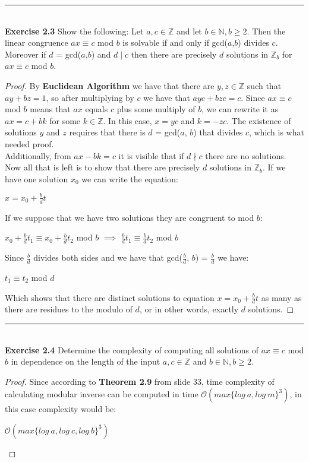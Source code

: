 \documentclass{article}
\begin{document}
\noindent\rule{12cm}{0.4pt}\\
\noindent \textbf{Exercise 2.3} Show the following:
Let $a, c \in \mathbb{Z}$ and let $b \in \mathbb{N}, b \geq 2$. Then the linear congruence $ax \equiv c$ mod $b$ is solvable if and only if gcd($a$,$b$) divides $c$. Moreover if $d$ = gcd($a$,$b$) and $d \mid c$ then there are precisely $d$ solutions in $\mathbb{Z}_{b}$ for $ax \equiv c$ mod $b$.
\begin{proof}
By \textbf{Euclidean Algorithm} we have that there are $y, z \in \mathbb{Z}$ such that $ay + bz = 1$, so after multiplying by $c$ we have that $ayc + bzc = c$. Since $ax \equiv c$ mod $b$ means that $ax$ equals $c$ plus some multiply of $b$, we can rewrite it as $ax = c + bk$ for some $k \in  \mathbb{Z}$. In this case, $x = yc$ and $k = -zc$. The existence of solutions $y$ and $z$ requires that there is $d$ = gcd($a$, $b$) that divides $c$, which is what needed proof. \\
Additionally, from $ax - bk = c$ it is visible that if $d \nmid c$ there are no solutions. Now all that is left is to show that there are precisely $d$ solutions in $\mathbb{Z}_b$. If we have one solution $x_0$ we can write the equation:
\begin{center}
$x = x_0 + \frac{b}{d}t$
\end{center}
If we suppose that we have two solutions they are congruent to mod $b$:
\begin{center}
$x_0 + \frac{b}{d}t_1 \equiv x_0 + \frac{b}{d}t_2$ mod $b$ $\implies$ $\frac{b}{d}t_1 \equiv \frac{b}{d}t_2$ mod $b$
\end{center}
Since $\frac{b}{d}$ divides both sides and we have that gcd($\frac{b}{d}$, $b$) = $\frac{b}{d}$ we have:
\begin{center}
	$t_1 \equiv t_2$ mod $d$
\end{center}
Which shows that there are distinct solutions to equation $x = x_0 + \frac{b}{d}t$ as many as there are residues to the modulo of $d$, or in other words, exactly $d$ solutions.
\end{proof}



\noindent\rule{12cm}{0.4pt}\\
\noindent \textbf{Exercise 2.4} Determine the complexity of computing all solutions of $ax \equiv c$ mod $b$ in dependence on the length of the input $a, c \in \mathbb{Z}$ and $b \in \mathbb{N}, b \geq 2$.
\begin{proof}
Since according to \textbf{Theorem 2.9} from slide 33, time complexity of calculating modular inverse can be computed in time $\mathcal{O}(max\{log\ a, log\ m\}^3)$, in this case complexity would be:
\begin{center}
$\mathcal{O}(max\{log\ a, log\ c, log\ b\}^3)$
\end{center}
\end{proof}
\end{document}
